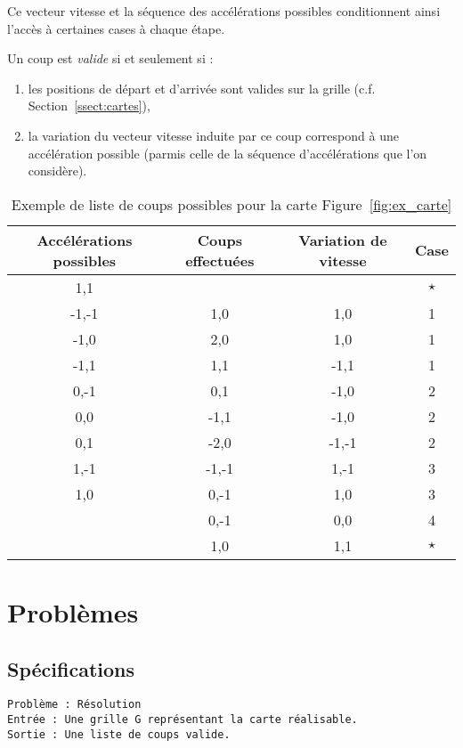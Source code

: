 Ce vecteur vitesse et la séquence des accélérations possibles conditionnent ainsi l'accès à certaines cases à chaque étape.

Un coup est \textit{valide} si et seulement si :
\begin{enumerate}
\item les positions de départ et d'arrivée sont valides sur la grille (c.f. Section~\vref{ssect:cartes}),
\item la variation du vecteur vitesse induite par ce coup correspond à une accélération possible (parmis celle de la séquence d'accélérations que l'on considère).
\end{enumerate}

\begin{table}[ht]
	\centering
	\begin{tabular}{| c || c | c | c |}
	\hline
	Accélérations possibles & Coups effectuées & Variation de vitesse & Case \\ \hline
	1,1 & &  & $\star$ \\ \hline
	-1,-1 & 1,0 & 1,0 & 1 \\ \hline
	-1,0 & 2,0 & 1,0 & 1 \\ \hline
	-1,1 & 1,1 & -1,1 & 1 \\ \hline
	0,-1 & 0,1 & -1,0 & 2 \\ \hline
	0,0 & -1,1 & -1,0 & 2 \\ \hline
	0,1 & -2,0 & -1,-1 & 2 \\ \hline
	1,-1 & -1,-1 & 1,-1 & 3 \\ \hline
	1,0 & 0,-1 & 1,0 & 3 \\ \hline
	& 0,-1 & 0,0 & 4 \\ \hline
	& 1,0 & 1,1 & $\star$ \\
	\hline
	\end{tabular}
	\caption{Exemple de liste de coups possibles pour la carte Figure~\vref{fig:ex_carte}}
	\label{tab:ex_coups}
\end{table}

\newpage

\section{Problèmes}
\subsection{Spécifications}

\begin{verbatim}
Problème : Résolution
Entrée : Une grille G représentant la carte réalisable.
Sortie : Une liste de coups valide.
\end{verbatim}


